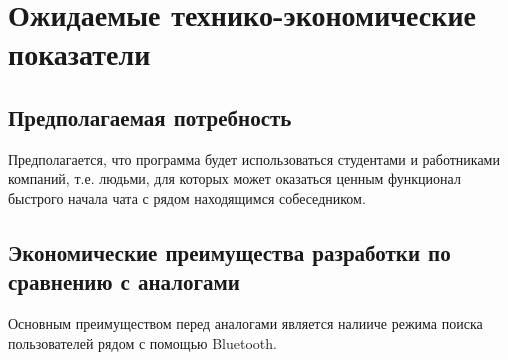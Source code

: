 \documentclass[explnote]{espd}
\begin{document}
\section{Ожидаемые технико-экономические показатели}
\subsection{Предполагаемая потребность}
Предполагается, что программа будет использоваться студентами и работниками компаний, т.е. людьми, для которых может оказаться ценным функционал быстрого начала чата с рядом находящимся собеседником.

\subsection{Экономические преимущества разработки по сравнению с аналогами}
Основным преимуществом перед аналогами является налииче режима поиска пользователей рядом с помощью Bluetooth.


\end{document}
